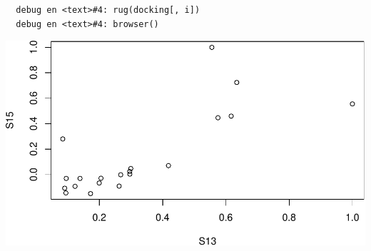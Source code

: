 \documentclass[12pt,twoside]{reedthesis}
\begin{document}
  \begin{verbatim}
  debug en <text>#4: rug(docking[, i])
  debug en <text>#4: browser()
  \end{verbatim}
  
  \begin{Shaded}
  \begin{Highlighting}[]
  \NormalTok{(}\NormalTok{(docking[}\OperatorTok{-}\NormalTok{(}\NormalTok{,}\NormalTok{,}\NormalTok{,}\NormalTok{,}\NormalTok{),}\OperatorTok{-}\NormalTok{]))}
  \end{Highlighting}
  \end{Shaded}
  
  \begin{center}\includegraphics{tesis_files/figure-latex/johan-21} \end{center}
  
  \begin{Shaded}
  \begin{Highlighting}[]
  \end{Highlighting}
  \end{Shaded}
  
\end{document}
